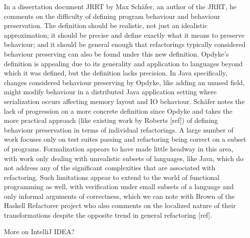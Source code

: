 In a dissertation document JRRT by Max Schäfer, an author of the JRRT, he comments on the difficulty of defining program behaviour and behaviour preservation. The definition should be realistic, not just an idealistic approximation; it should be precise and define exactly what it means to preserve behaviour; and it should be general enough that refactorings typically considered behaviour preserving can also be found under this new definition. Opdyke's definition is appealing due to its generality and application to languages beyond which it was defined, but the definition lacks precision. In Java specifically, changes considered behaviour preserving by Opdyke, like adding an unused field, might modify behaviour in a distributed Java application setting where serialization occurs affecting memory layout and IO behaviour. Schäfer notes the lack of progression on a more concrete definition since Opdyke and takes the more practical approach (like existing work by Roberts [ref]) of defining behaviour preservation in terms of individual refactorings. A large number of work focuses only on test suites passing and refactoring being correct on a subset of programs. Formalization appears to have made little headway in this area, with work only dealing with unrealistic subsets of languages, like Java, which do not address any of the significant complexities that are associated with refactoring. Such limitations appear to extend to the world of functional programming as well, with verification under small subsets of a language and only informal arguments of correctness, which we can note with Brown of the Haskell Refactorer project who also comments on the localized nature of their transformations despite the opposite trend in general refactoring [ref].


More on IntelliJ IDEA? 
